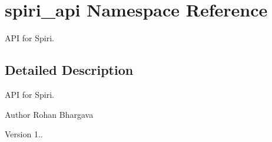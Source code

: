 \hypertarget{namespacespiri__api}{\section{spiri\-\_\-api Namespace Reference}
\label{namespacespiri__api}
}


A\-P\-I for Spiri.  




\subsection{Detailed Description}
A\-P\-I for Spiri. \begin{DoxyAuthor}{Author}
Rohan Bhargava 
\end{DoxyAuthor}
\begin{DoxyVersion}{Version}
1.. 
\end{DoxyVersion}
